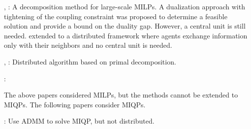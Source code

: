 \documentclass[twocolumn,amsthm]{autart}%
\theoremstyle{definition}
\theoremstyle{plain}
\begin{document}
 




\cite{vujanic2016decomposition}, \cite{falsone2019decentralized}: A decomposition method for large-scale MILPs. 
A dualization approach with tightening of the coupling constraint was proposed to determine a feasible solution and provide a bound on the duality gap.
However, a central unit is still needed.
\cite{falsone2018distributed} extended to a distributed framework where agents exchange information only with their neighbors and no central unit is needed.

\cite{camisa2018primal}, \cite{camisa2021distributed}: 
Distributed algorithm based on primal decomposition.


\cite{testa2019distributed}:


The above papers considered MILPs, but the methods cannot be extended to MIQPs. The following papers consider MIQPs.

\cite{takapoui2020simple}: Use ADMM to solve MIQP, but not distributed.
\end{document}
